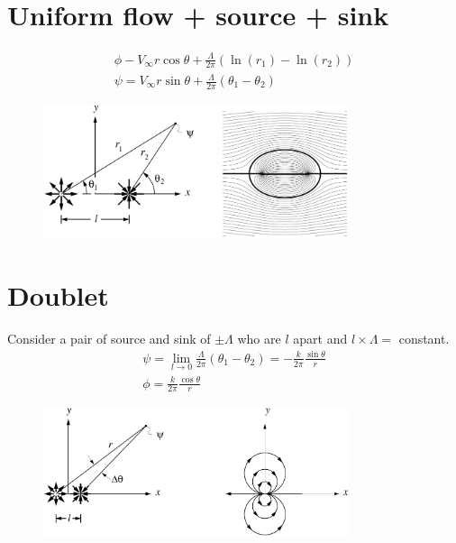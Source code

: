 \documentclass[class=report, crop=false, 12pt,a4paper]{standalone}
\begin{document}
\section{Uniform flow + source + sink}
\begin{gather}
  \phi - V_{\infty} r \cos \theta + \frac{\Lambda}{2\pi}(\ln (r_1) - \ln (r_2))\\
  \psi = V_{\infty} r \sin \theta + \frac{\Lambda}{2\pi} (\theta_1 - \theta_2)
\end{gather}
\begin{figure}[H]
  \centering
  \includegraphics[width = 0.8\textwidth]{../img/diagram20.png}
\end{figure}
\section{Doublet}
Consider a pair of source and sink of $\pm \Lambda$ who are $l$ apart and $l\times\Lambda = $ constant.
\begin{gather}
  \psi =\lim_{l\rightarrow 0} \frac{\Lambda}{2\pi} (\theta_1 - \theta_2) = -\frac{k}{2\pi} \frac{\sin \theta}{r} \\
  \phi = \frac{k}{2\pi} \frac{\cos \theta}{r}
\end{gather}
\begin{figure}[H]
  \centering
  \includegraphics[width = 0.8\textwidth]{../img/diagram21.png}
\end{figure}
\end{document}
